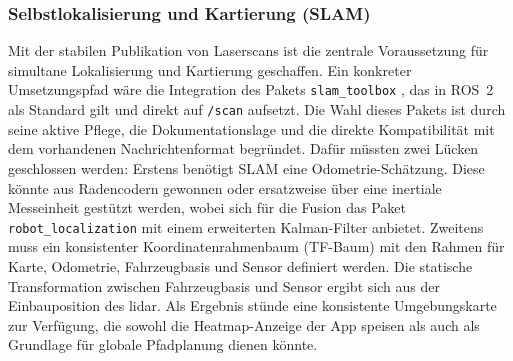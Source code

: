 \subsubsection{Selbstlokalisierung und Kartierung (SLAM)}
Mit der stabilen Publikation von Laserscans ist die zentrale Voraussetzung für simultane Lokalisierung und Kartierung \cite{cadena2016slam} geschaffen. Ein konkreter Umsetzungspfad wäre die Integration des Pakets \texttt{slam\_toolbox} \cite{macenski2021slamtoolbox}, das in ROS~2 als Standard gilt und direkt auf \texttt{/scan} aufsetzt. Die Wahl dieses Pakets ist durch seine aktive Pflege, die Dokumentationslage und die direkte Kompatibilität mit dem vorhandenen Nachrichtenformat begründet. Dafür müssten zwei Lücken geschlossen werden: Erstens benötigt SLAM eine Odometrie-Schätzung. Diese könnte aus Radencodern gewonnen oder ersatzweise über eine inertiale Messeinheit gestützt werden, wobei sich für die Fusion das Paket \texttt{robot\_localization} mit einem erweiterten Kalman-Filter \cite{moore2016robotlocalization} anbietet. Zweitens muss ein konsistenter Koordinatenrahmenbaum (TF-Baum) mit den Rahmen für Karte, Odometrie, Fahrzeugbasis und Sensor definiert werden. Die statische Transformation zwischen Fahrzeugbasis und Sensor ergibt sich aus der Einbauposition des \gls{lidar}. Als Ergebnis stünde eine konsistente Umgebungskarte zur Verfügung, die sowohl die Heatmap-Anzeige der App speisen als auch als Grundlage für globale Pfadplanung dienen könnte.

